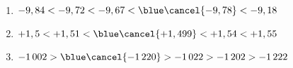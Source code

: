    \ \\ [-7mm]
   {\baselineskip=7mm
   \begin{enumerate}
      \item $-9,84 < -9,72 < -9,67 < {\blue\cancel{-9,78}} < -9,18$
      \item $+1,5 < +1,51 < {\blue\cancel{+1,499}} < +1,54 < +1,55$
      \item $-1\,002 > {\blue\cancel{-1\,220}} > -1\,022 > -1\,202 > -1\,222$
   \end{enumerate}}
